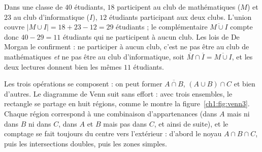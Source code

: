 \begin{center}
\label{ch1:fig:cptec}
\end{center}

\begin{exemple}
Dans une classe de $40$ étudiants, $18$ participent au club de mathématiques ($M$) et $23$ au club d'informatique ($I$), $12$ étudiants participant aux deux clubs. L'union couvre $|M \cup I| = 18 + 23 - 12 = 29$ étudiants ; le complémentaire $\overline{M \cup I}$ compte donc $40 - 29 = 11$ étudiants qui ne participent à aucun club. Les lois de De Morgan le confirment : ne participer à aucun club, c'est ne pas être au club de mathématiques \emph{et} ne pas être au club d'informatique, soit $\overline{M} \cap \overline{I} = \overline{M \cup I}$, et les deux lectures donnent bien les mêmes $11$ étudiants.
\end{exemple}

Les trois opérations se composent : on peut former $\overline{A \cap B}$, $(A \cup B) \cap C$ et bien d'autres. Le diagramme de Venn suit sans effort : avec trois ensembles, le rectangle se partage en huit régions, comme le montre la figure~\ref{ch1:fig:venn3}. Chaque région correspond à une combinaison d'appartenances (dans $A$ mais ni dans $B$ ni dans $C$, dans $A$ et $B$ mais pas dans $C$, et ainsi de suite), et le comptage se fait toujours du centre vers l'extérieur : d'abord le noyau $A \cap B \cap C$, puis les intersections doubles, puis les zones simples.

